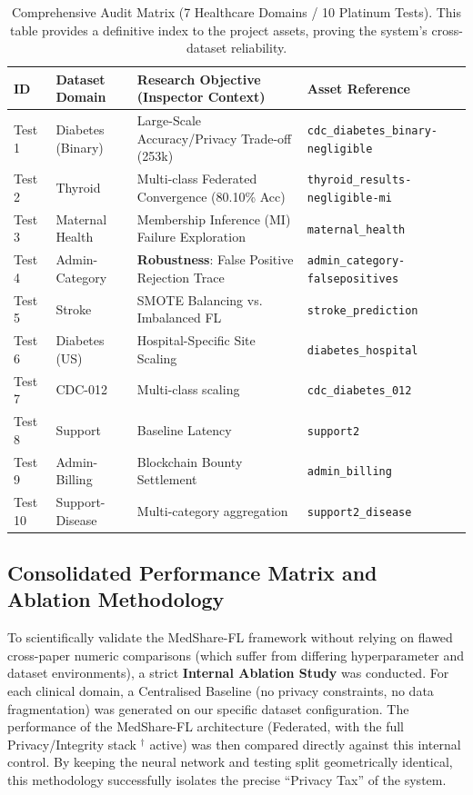 \documentclass[10pt, a4paper, twocolumn]{article}
\begin{document}
\begin{table}[hbt!]
\centering
\scriptsize
\begin{tabular}{lp{2.5cm}p{5.5cm}l}
\toprule
\textbf{ID} & \textbf{Dataset Domain} & \textbf{Research Objective (Inspector Context)} & \textbf{Asset Reference} \\
\midrule
Test 1 & Diabetes (Binary) & Large-Scale Accuracy/Privacy Trade-off (253k) & \texttt{cdc\_diabetes\_binary-negligible} \\
Test 2 & Thyroid & Multi-class Federated Convergence (80.10\% Acc) & \texttt{thyroid\_results-negligible-mi} \\
Test 3 & Maternal Health & Membership Inference (MI) Failure Exploration & \texttt{maternal\_health} \\
Test 4 & Admin-Category & \textbf{Robustness}: False Positive Rejection Trace & \texttt{admin\_category-falsepositives} \\
Test 5 & Stroke & SMOTE Balancing vs. Imbalanced FL & \texttt{stroke\_prediction} \\
Test 6 & Diabetes (US) & Hospital-Specific Site Scaling & \texttt{diabetes\_hospital} \\
Test 7 & CDC-012 & Multi-class scaling & \texttt{cdc\_diabetes\_012} \\
Test 8 & Support & Baseline Latency & \texttt{support2} \\
Test 9 & Admin-Billing & Blockchain Bounty Settlement & \texttt{admin\_billing} \\
Test 10 & Support-Disease & Multi-category aggregation & \texttt{support2\_disease} \\
\bottomrule
\end{tabular}
\caption{Comprehensive Audit Matrix (7 Healthcare Domains / 10 Platinum Tests). This table provides a definitive index to the project assets, proving the system's cross-dataset reliability.}
\end{table}

\subsection{Consolidated Performance Matrix and Ablation Methodology}

To scientifically validate the MedShare-FL framework without relying on flawed cross-paper numeric comparisons (which suffer from differing hyperparameter and dataset environments), a strict \textbf{Internal Ablation Study} was conducted. For each clinical domain, a Centralised Baseline (no privacy constraints, no data fragmentation) was generated on our specific dataset configuration. The performance of the MedShare-FL architecture (Federated, with the full Privacy/Integrity stack $^\dagger$ active) was then compared directly against this internal control. By keeping the neural network and testing split geometrically identical, this methodology successfully isolates the precise ``Privacy Tax'' of the system.
\end{document}
